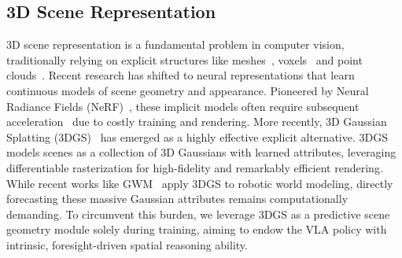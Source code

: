 \subsection{3D Scene Representation} 

3D scene representation is a fundamental problem in computer vision, traditionally relying on explicit structures like meshes~\cite{lorensen1998marching}, voxels~\cite{wu20153d} and point clouds~\cite{qi2017pointnet}. Recent research has shifted to neural representations that learn continuous models of scene geometry and appearance. Pioneered by Neural Radiance Fields (NeRF)~\cite{mildenhall2021nerf}, these implicit models often require subsequent acceleration~\cite{muller2022instant,xu2022point,hu2022efficientnerf} due to costly training and rendering. More recently, 3D Gaussian Splatting (3DGS)~\cite{kerbl20233d,yan2024street,wu20244d,ren2024scube} has emerged as a highly effective explicit alternative. 3DGS models scenes as a collection of 3D Gaussians with learned attributes, leveraging differentiable rasterization for high-fidelity and remarkably efficient rendering. While recent works like GWM~\cite{lu2025gwm} apply 3DGS to robotic world modeling, directly forecasting these massive Gaussian attributes remains computationally demanding. To circumvent this burden, we leverage 3DGS as a predictive scene geometry module solely during training, aiming to endow the VLA policy with intrinsic, foresight-driven spatial reasoning ability.
